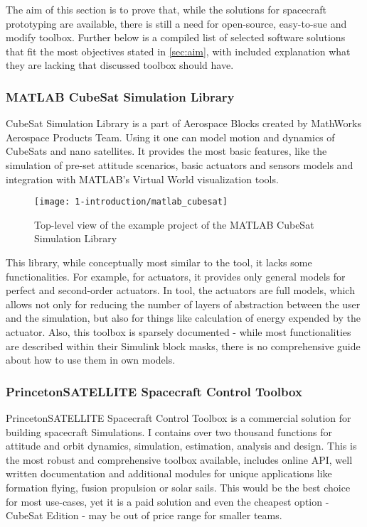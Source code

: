     The aim of this section is to prove that, while the solutions for spacecraft prototyping are available, there is still a need for open-source, easy-to-sue and modify toolbox. Further below is a compiled list of selected software solutions that fit the most objectives stated in \autoref{sec:aim}, with included explanation what they are lacking that discussed toolbox should have.
 

    \subsubsection{MATLAB CubeSat Simulation Library}
        CubeSat Simulation Library is a part of Aerospace Blocks created by MathWorks Aerospace Products Team. Using it one can model motion and dynamics of CubeSats and nano satellites. It provides the most basic features, like the simulation of pre-set attitude scenarios, basic actuators and sensors models and integration with MATLAB's Virtual World visualization tools.
        
        \begin{figure}[H]
            \centering
            \texttt{[image: 1-introduction/matlab\_cubesat]}
            \caption{Top-level view of the example project of the MATLAB CubeSat Simulation Library}
            \label{fig:matlab_cubesat}
        \end{figure}

        This library, while conceptually most similar to the \ac{tool}, it lacks some functionalities. For example, for actuators, it provides only general models for perfect and second-order actuators. In \ac{tool}, the actuators are full models, which allows not only for reducing the number of layers of abstraction between the user and the simulation, but also for things like calculation of energy expended by the actuator. Also, this toolbox is sparsely documented - while most functionalities are described within their Simulink block masks, there is no comprehensive guide about how to use them in own models.

    \subsubsection{PrincetonSATELLITE Spacecraft Control Toolbox}
        PrincetonSATELLITE Spacecraft Control Toolbox is a commercial solution for building spacecraft Simulations. I contains over two thousand functions for attitude and orbit dynamics, simulation, estimation, analysis and design. This is the most robust and comprehensive toolbox available, includes online API, well written documentation and additional modules for unique applications like formation flying, fusion propulsion or solar sails. This would be the best choice for most use-cases, yet it is a paid solution and even the cheapest option - CubeSat Edition - may be out of price range for smaller teams.


